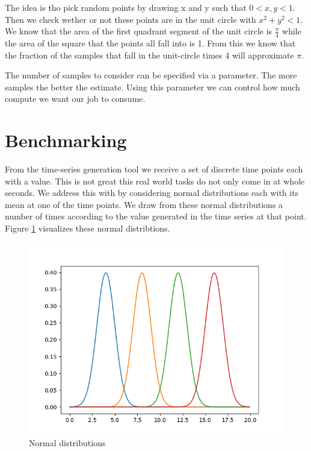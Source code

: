 The idea is tho pick random points by drawing x and y such that $0 < x, y < 1$. Then we check wether or not these points are in the unit circle with $x^2 + y^2 < 1$. We know that the area of the first quadrant segment of the unit circle is $\frac{\pi}{4}$ while the area of the square that the points all fall into is 1. From this we know that the fraction of the samples that fall in the unit-circle times 4 will approximate $\pi$.

The number of samples to consider can be specified via a parameter. The more samples the better the estimate. Using this parameter we can control how much compute we want our job to consume. 

\section{Benchmarking}

From the time-series generation tool we receive a set of discrete time points each with a value. This is not great this real world tasks do not only come in at whole seconds. We address this with by considering normal distributions each with its mean at one of the time points. We draw from these normal distributions a number of times according to the value generated in the time series at that point. Figure \ref{fig:normal-dists} visualizes these normal distribtions.

\begin{figure}
   \centering
   \includegraphics[scale=0.70]{figures/normal-dists.png}
\caption{Normal distributions}    
\label{fig:normal-dists}
\end{figure}


